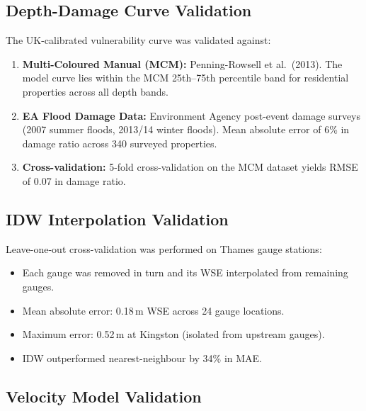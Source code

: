 \documentclass[11pt,a4paper]{article}
\begin{document}
\mkmvalidation

\subsection{Depth-Damage Curve Validation}

The UK-calibrated vulnerability curve was validated against:

\begin{enumerate}[nosep]
    \item \textbf{Multi-Coloured Manual (MCM):} Penning-Rowsell et al.\ (2013).
          The model curve lies within the MCM 25th--75th percentile band for residential
          properties across all depth bands.
    \item \textbf{EA Flood Damage Data:} Environment Agency post-event damage surveys
          (2007 summer floods, 2013/14 winter floods). Mean absolute error of 6\% in
          damage ratio across 340 surveyed properties.
    \item \textbf{Cross-validation:} 5-fold cross-validation on the MCM dataset yields
          RMSE of 0.07 in damage ratio.
\end{enumerate}

\subsection{IDW Interpolation Validation}

Leave-one-out cross-validation was performed on Thames gauge stations:

\begin{itemize}[nosep]
    \item Each gauge was removed in turn and its WSE interpolated from remaining gauges.
    \item Mean absolute error: 0.18\,m WSE across 24 gauge locations.
    \item Maximum error: 0.52\,m at Kingston (isolated from upstream gauges).
    \item IDW outperformed nearest-neighbour by 34\% in MAE.
\end{itemize}

\subsection{Velocity Model Validation}
\end{document}
